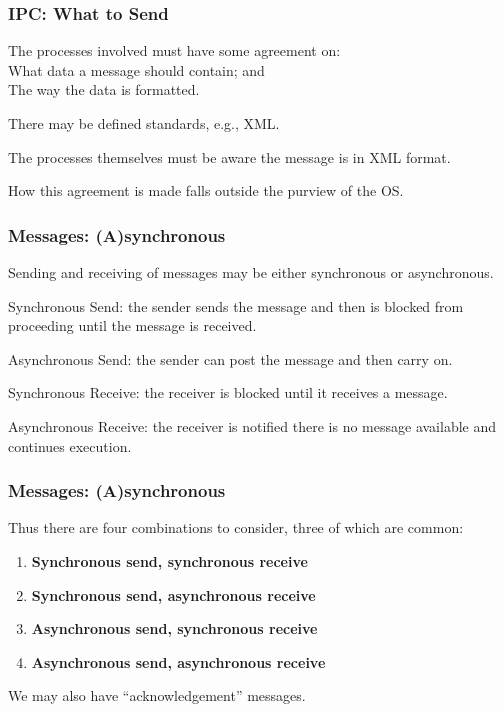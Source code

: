 \begin{frame}
	\frametitle{IPC: What to Send}

	The processes involved must have some agreement on:\\
	\quad What data a message should contain; and\\
	\quad The way the data is formatted.

	There may be defined standards, e.g., XML.

	The processes themselves must be aware the message is in XML format.

	How this agreement is made falls outside the purview of the OS.

\end{frame}

\begin{frame}
	\frametitle{Messages: (A)synchronous}

	Sending and receiving of messages may be either synchronous or asynchronous.

	Synchronous Send: the sender sends the message and then is blocked from proceeding until the message is received.

	Asynchronous Send: the sender can post the message and then carry on.

	Synchronous Receive: the receiver is blocked until it receives a message.

	Asynchronous Receive: the receiver is notified there is no message available and continues execution.

\end{frame}

\begin{frame}
	\frametitle{Messages: (A)synchronous}

	Thus there are four combinations to consider, three of which are common:

	\begin{enumerate}
		\item \textbf{Synchronous send, synchronous receive}
		\item \textbf{Synchronous send, asynchronous receive}
		\item \textbf{Asynchronous send, synchronous receive}
		\item \textbf{Asynchronous send, asynchronous receive}
	\end{enumerate}

	We may also have ``acknowledgement'' messages.

\end{frame}

